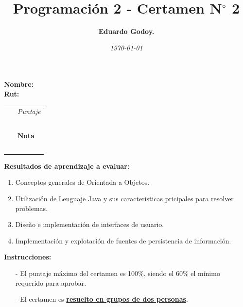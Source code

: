 \documentclass{exam}
\title{\huge\bfseries{\color{azul}Programaci\'on 2 - Certamen N$^{\circ}$ 2 }}
\author{\textbf{Eduardo Godoy.}}
\date{\em \today}
\begin{document}


\maketitle

\begin{multicols}{2}
    \begin{flushleft}
        \textbf{Nombre:} \\
        \vspace*{2mm}
        \textbf{Rut:}
    \end{flushleft}
    \begin{center}
        \begin{table}[H]
        \begin{tabular}{p{4cm}|p{3cm}|}
        \cline{2-2}
            ~ & {\em {\scriptsize Puntaje}} \\ & ~ \\
            ~ & \textbf{Nota} \\ & ~ \\
        \cline{2-2}
        \end{tabular}
        \end{table}
    \end{center}
\end{multicols}


\vspace*{-7mm}
\noindent
\textbf{Resultados de aprendizaje a evaluar:}
\begin{enumerate}
  \item Conceptos generales de Orientada a Objetos.
  \item Utilizaci\'on de Lenguaje Java y sus caracter\'isticas pricipales para resolver problemas.
  \item Diseño e implementaci\'on de interfaces de usuario.
  \item Implementaci\'on y explotaci\'on de fuentes de persistencia de informaci\'on.
\end{enumerate}
\vspace{5mm}
\noindent
\textbf{Instrucciones:}
\begin{itemize}
  \item[-] El puntaje m\'aximo del certamen es 100\%, siendo el 60\% el m\'inimo requerido para aprobar.
  \item[-] El certamen es \underline{\textbf{resuelto en grupos de dos personas}}.
\end{itemize}
\end{document}
